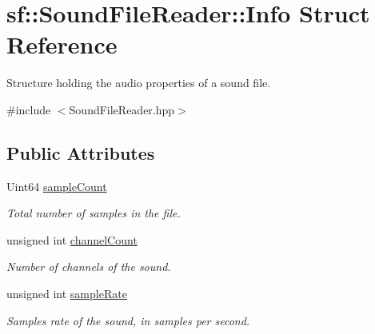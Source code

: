 \hypertarget{structsf_1_1_sound_file_reader_1_1_info}{}\section{sf\+:\+:Sound\+File\+Reader\+:\+:Info Struct Reference}
\label{structsf_1_1_sound_file_reader_1_1_info}


Structure holding the audio properties of a sound file.  




{\ttfamily \#include $<$Sound\+File\+Reader.\+hpp$>$}

\subsection*{Public Attributes}
\begin{DoxyCompactItemize}
\item 
\mbox{\label{structsf_1_1_sound_file_reader_1_1_info_a74b40b4693d7000571484736d1367167}} 
Uint64 \hyperlink{structsf_1_1_sound_file_reader_1_1_info_a74b40b4693d7000571484736d1367167}{sample\+Count}
\begin{DoxyCompactList}\small\item\em Total number of samples in the file. \end{DoxyCompactList}\item 
\mbox{\label{structsf_1_1_sound_file_reader_1_1_info_ac748bb30768d1a3caf329e95d31d6d2a}} 
unsigned int \hyperlink{structsf_1_1_sound_file_reader_1_1_info_ac748bb30768d1a3caf329e95d31d6d2a}{channel\+Count}
\begin{DoxyCompactList}\small\item\em Number of channels of the sound. \end{DoxyCompactList}\item 
\mbox{\label{structsf_1_1_sound_file_reader_1_1_info_a06ef71c19e7de190b294ae02c361f752}} 
unsigned int \hyperlink{structsf_1_1_sound_file_reader_1_1_info_a06ef71c19e7de190b294ae02c361f752}{sample\+Rate}
\begin{DoxyCompactList}\small\item\em Samples rate of the sound, in samples per second. \end{DoxyCompactList}\end{DoxyCompactItemize}


